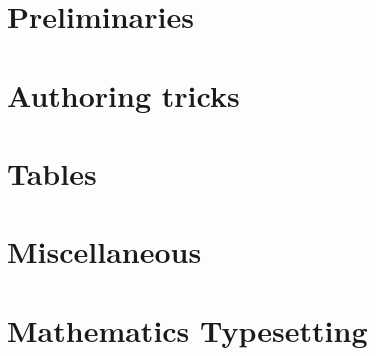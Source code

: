 \documentclass[oneside]{book}
\begin{document}
	
	\tableofcontents
	
	\chapter{Preliminaries}
	
	
	
	\chapter{Authoring tricks}
	
	
	
	
	
	
	
	\chapter{Tables}
	
	
	\chapter{Miscellaneous}	
	
	
	\chapter{Mathematics Typesetting}
	
	
	
\end{document}

